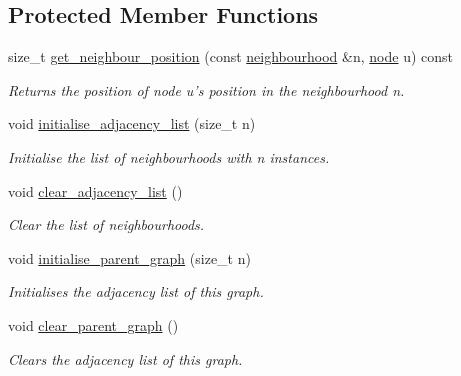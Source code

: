 \subsection*{Protected Member Functions}
\begin{DoxyCompactItemize}
\item 
size\-\_\-t \hyperlink{classlgraph_1_1xxgraph_a8c176b1d19cf8d0b299c419e325df21d}{get\-\_\-neighbour\-\_\-position} (const \hyperlink{namespacelgraph_a052e7766c13f3a43cec0aec8173fdede}{neighbourhood} \&n, \hyperlink{namespacelgraph_a397169dd66adf725210a30fb7251773e}{node} u) const 
\begin{DoxyCompactList}\small\item\em Returns the position of node {\itshape u's} position in the neighbourhood {\itshape n}. \end{DoxyCompactList}\item 
\hypertarget{classlgraph_1_1xxgraph_a682d586f850add8b7e637aeea81b0292}{void \hyperlink{classlgraph_1_1xxgraph_a682d586f850add8b7e637aeea81b0292}{initialise\-\_\-adjacency\-\_\-list} (size\-\_\-t n)}\label{classlgraph_1_1xxgraph_a682d586f850add8b7e637aeea81b0292}

\begin{DoxyCompactList}\small\item\em Initialise the list of neighbourhoods with {\itshape n} instances. \end{DoxyCompactList}\item 
\hypertarget{classlgraph_1_1xxgraph_a6b15c62c68919722f7eb18fe273d45fe}{void \hyperlink{classlgraph_1_1xxgraph_a6b15c62c68919722f7eb18fe273d45fe}{clear\-\_\-adjacency\-\_\-list} ()}\label{classlgraph_1_1xxgraph_a6b15c62c68919722f7eb18fe273d45fe}

\begin{DoxyCompactList}\small\item\em Clear the list of neighbourhoods. \end{DoxyCompactList}\item 
void \hyperlink{classlgraph_1_1xxgraph_a50c658dd39e6b1d38bf7e514daa2f33c}{initialise\-\_\-parent\-\_\-graph} (size\-\_\-t n)
\begin{DoxyCompactList}\small\item\em Initialises the adjacency list of this graph. \end{DoxyCompactList}\item 
void \hyperlink{classlgraph_1_1xxgraph_a4122495066e4402cbf6d2d9bb82d54cc}{clear\-\_\-parent\-\_\-graph} ()
\begin{DoxyCompactList}\small\item\em Clears the adjacency list of this graph. \end{DoxyCompactList}\end{DoxyCompactItemize}
